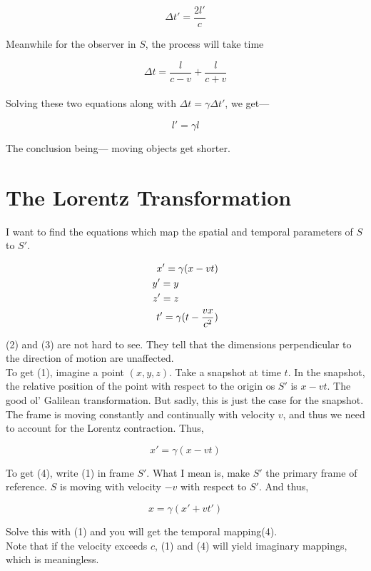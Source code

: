 \documentclass[12pt]{article}
\begin{document}
\[\Delta t' = \frac{2l'}{c}\]

Meanwhile for the observer in $S$, the process will take time 

\[\Delta t = \frac{l}{c-v}+\frac{l}{c+v}\]
\\
Solving these two equations along with $\Delta t = \gamma \Delta t'$, we get---

\[l' = \gamma l\]

The conclusion being--- moving objects get shorter. 

\section{The Lorentz Transformation}
I want to find the equations which map the spatial and temporal parameters of $S$ to $S'$. 

\begin{align}
x' = \gamma(x-vt)\\
y' = y\hspace{1.4cm}\\
z' = z\hspace{1.4cm}\\
\hspace{0.1cm} t' = \gamma(t-\frac{vx}{c^2})
\end{align}

(2) and (3) are not hard to see. They tell that the dimensions perpendicular to the direction of motion 
are unaffected. \\
To get (1), imagine a point $(x,y,z)$. Take a snapshot at time $t$. In the snapshot, the relative position of the point with respect to the origin os $S'$ is $x-vt$. The 
good ol' Galilean transformation. But sadly, this is just the case for the snapshot. The frame is moving constantly and continually with velocity $v$, and thus 
we need to account for the Lorentz contraction. Thus, 

\[x' = \gamma(x-vt)\]

To get (4), write (1) in frame $S'$. What I mean is, make $S'$ the primary frame of reference. $S$ is moving with velocity 
$-v$ with respect to $S'$. And thus, 

\[x = \gamma(x'+vt')\]

Solve this with (1) and you will get the temporal mapping(4). \\
Note that if the velocity exceeds $c$, (1) and (4) will yield imaginary mappings, which is meaningless. 
\end{document}
